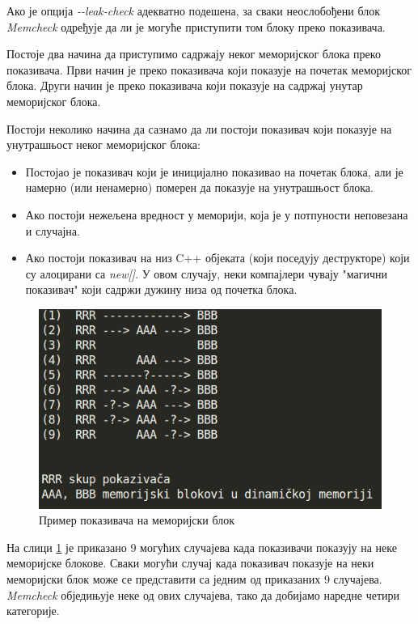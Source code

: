 \documentclass[12pt,oneside]{memoir}
\begin{document}
\indent Ако је опција \textit{-\--leak-check} адекватно подешена, за сваки неослобођени блок \textit{Memcheck} одређује да ли је могуће приступити том блоку преко показивача.

\indent Постоје два начина да приступимо садржају неког меморијског блока преко показивача. Први начин је преко показивача који показује на почетак меморијског блока. Други начин је преко показивача који показује на садржај унутар меморијског блока.

\indent Постоји неколико начина да сазнамо да ли постоји показивач који показује на унутрашњост неког меморијског блока:
\begin{itemize}
  \item Постојао је показивач који је иницијално показивао на почетак блока, али је намерно (или ненамерно) померен да показује на унутрашњост блока.
  \item Ако постоји нежељена вредност у меморији, која је у потпуности неповезана и случајна.
  \item Ако постоји показивач на низ C++ објеката (који поседују деструкторе) који су алоцирани са \textit{new[]}. У овом случају, неки компајлери чувају "магични показивач" који садржи дужину низа од почетка блока.
\end{itemize}

\begin{figure}[h!]
\begin{center}
\includegraphics[scale=0.75]{slika7.png}
\end{center}
\caption{Пример показивача на меморијски блок}
\label{fig:memblok}
\end{figure}

\indent На слици \ref{fig:memblok} је приказано 9 могућих случајева када показивачи показују на неке меморијске блокове. Сваки могући случај када показивач показује на неки меморијски блок може се представити са једним од приказаних 9 случајева. \textit{Memcheck} обједињује неке од ових случајева, тако да добијамо наредне четири категорије.
\end{document}
